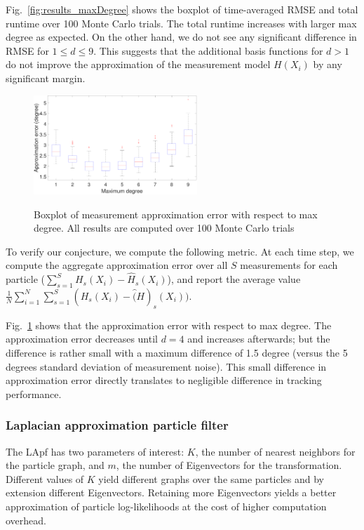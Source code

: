 \documentclass[10pt,letterpaper,final]{article}
\begin{document}
Fig.~\ref{fig:results_maxDegree} shows the boxplot of time-averaged RMSE and total runtime over 100 Monte Carlo trials. The total runtime increases with larger max degree as expected. On the other hand, we do not see any significant difference in RMSE for $1\leq d \leq 9$. This suggests that the additional basis functions for $d>1$ do not improve the approximation of the measurement model $H(X_i)$ by any significant margin. 

\begin{figure}
\centering
\includegraphics[width=0.55\textwidth]{Figures/LCpf_approx_error.pdf}
\label{fig:LCpf_approx_error}
\caption{Boxplot of measurement approximation error with respect to max degree. All results are computed over 100 Monte Carlo trials}
\end{figure}

To verify our conjecture, we compute the following metric. At each time step, we compute the aggregate approximation error over all $S$ measurements for each particle ($\sum_{s=1}^S H_s(X_i)-\hat{H}_s(X_i)$), and report the average value $\frac{1}{N}\sum_{i=1}^N \sum_{s=1}^S(H_s(X_i)-\hat(H)_s(X_i))$. 

Fig.~\ref{fig:LCpf_approx_error} shows that the approximation error with respect to max degree. The approximation error decreases until $d=4$ and increases afterwards; but the difference is rather small with a maximum difference of 1.5 degree (versus the 5 degrees standard deviation of measurement noise). This small difference in approximation error directly translates to negligible difference in tracking performance. %

\subsubsection{Laplacian approximation particle filter}
The LApf has two parameters of interest: $K$, the number of nearest neighbors for the particle graph, and $m$, the number of Eigenvectors for the transformation. Different values of $K$ yield different graphs over the same particles and by extension different Eigenvectors. Retaining more Eigenvectors yields a better approximation of particle log-likelihoods at the cost of higher computation overhead. 
\end{document}
